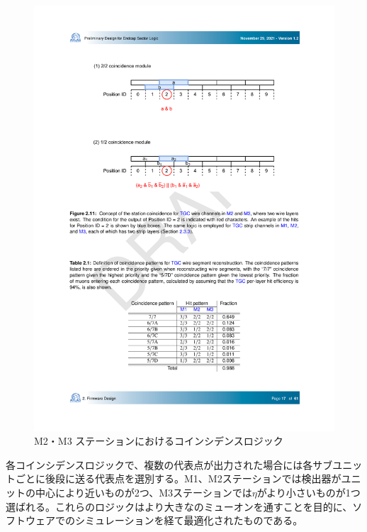 \begin{figure} 
\centering
\includegraphics[width=16cm]{fig/SL/StationCoin_doublet.pdf}
\caption[M2・M3 ステーションにおけるコインシデンスロジック]{M2・M3 ステーションにおけるコインシデンスロジック}
\label{StationCoin_doublet}
\end{figure}

各コインシデンスロジックで、複数の代表点が出力された場合には各サブユニットごとに後段に送る代表点を選別する。M1、M2ステーションでは検出器がユニットの中心により近いものが2つ、M3ステーションでは$\eta$がより小さいものが1つ選ばれる。これらのロジックはより大きな\pt のミューオンを通すことを目的に、ソフトウェアでのシミュレーションを経て最適化されたものである。

